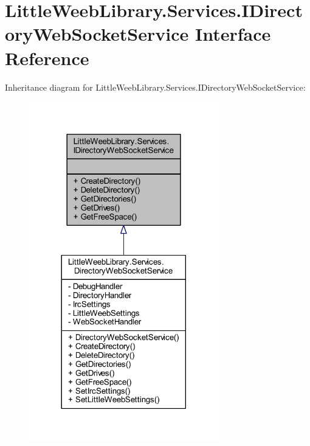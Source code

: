 \hypertarget{interface_little_weeb_library_1_1_services_1_1_i_directory_web_socket_service}{}\section{Little\+Weeb\+Library.\+Services.\+I\+Directory\+Web\+Socket\+Service Interface Reference}
\label{interface_little_weeb_library_1_1_services_1_1_i_directory_web_socket_service}


Inheritance diagram for Little\+Weeb\+Library.\+Services.\+I\+Directory\+Web\+Socket\+Service\+:\nopagebreak
\begin{figure}[H]
\begin{center}
\leavevmode
\includegraphics[width=233pt]{interface_little_weeb_library_1_1_services_1_1_i_directory_web_socket_service__inherit__graph}
\end{center}
\end{figure}


